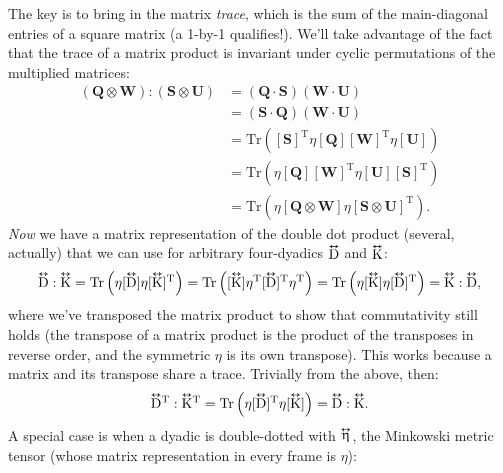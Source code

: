 \documentclass[12pt]{article}
\renewcommand{\vv}[1]{\mathbf{#1}}
\newcommand{\tightoverset}[2]{%
  \mathop{#2}\limits^{\vbox to -.5ex{\kern-0.75ex\hbox{$#1$}\vss}}}
\newcommand{\inlinedy}[1]{\tightoverset{\text{\tiny$\bm\leftrightarrow$}}{#1}}
\newcommand{\capdy}[1]{ \overset{ \text{\tiny$\bm\leftrightarrow$} }{\vphantom{\text{\small{A}}}\smash{#1}} }
\begin{document}
The key is to bring in the matrix \emph{trace}, which is the sum of the main-diagonal entries of a square matrix (a 1-by-1 qualifies!). We'll take advantage of the fact that the trace of a matrix product is invariant under cyclic permutations of the multiplied matrices:
\begin{equation*}
\begin{aligned}
(\vv Q \otimes \vv W) : (\vv S \otimes \vv U) &= (\vv Q \cdot \vv S) (\vv W \cdot \vv U) \\
&= (\vv S \cdot \vv Q) (\vv W \cdot \vv U) \\
&= \mathrm{Tr} \left( [\vv S]^{\mathrm{T}} \eta [\vv Q] [\vv W]^{\mathrm{T}} \eta [\vv U] \right) \\[2pt]
&= \mathrm{Tr} \left( \eta [\vv Q] [\vv W]^{\mathrm{T}} \eta [\vv U] [\vv S]^{\mathrm{T}} \right) \\[2pt]
&= \mathrm{Tr} \left( \eta [\vv Q \otimes \vv W] \eta [\vv S \otimes \vv U]^\mathrm{T} \right).
\end{aligned}
\end{equation*}
\emph{Now} we have a matrix representation of the double dot product (several, actually) that we can use for arbitrary four-dyadics $\inlinedy{\mathrm{D}}$ and $\inlinedy{\mathrm{K}}$:
\begin{equation*}
\capdy{\mathrm{D}} : \capdy{\mathrm{K}} = \mathrm{Tr} \left( \eta [\capdy{\mathrm{D}}] \eta [ \capdy{\mathrm{K}} ]^{\mathrm{T}} \right) = \mathrm{Tr} \left( [\capdy{\mathrm{K}}] \eta^{\mathrm{T}} [ \capdy{\mathrm{D}} ]^{\mathrm{T}} \eta^{\mathrm{T}} \right) = \mathrm{Tr} \left( \eta [\capdy{\mathrm{K}}] \eta [ \capdy{\mathrm{D}} ]^{\mathrm{T}} \right) = \capdy{\mathrm{K}} : \capdy{\mathrm{D}} ,
\end{equation*}
where we've transposed the matrix product to show that commutativity still holds (the transpose of a matrix product is the product of the transposes in reverse order, and the symmetric $\eta$ is its own transpose). This works because a matrix and its transpose share a trace. Trivially from the above, then:
\begin{equation*}
\capdy{\mathrm{D}} \mkern0mu ^\mathrm{T} : \capdy{\mathrm{K}} \mkern0mu ^\mathrm{T} = \mathrm{Tr} \left( \eta [\capdy{\mathrm{D}}]^{\mathrm{T}} \eta [ \capdy{\mathrm{K}} ] \right) = \capdy{\mathrm{D}} : \capdy{\mathrm{K}} .
\end{equation*}
A special case is when a dyadic is double-dotted with $\inlinedy{\upeta}$, the Minkowski metric tensor (whose matrix representation in every frame is $\eta$):
\end{document}

